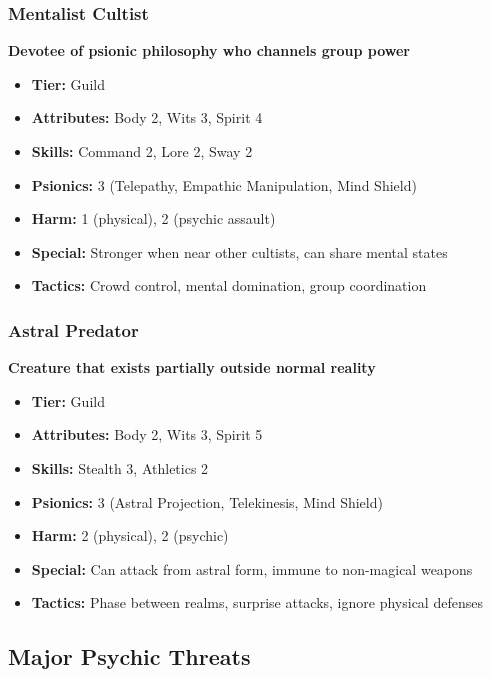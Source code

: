 \documentclass[11pt,twoside]{article}
\begin{document}
\subsubsection{Mentalist Cultist}
\textbf{Devotee of psionic philosophy who channels group power}
\begin{itemize}[leftmargin=*]
    \item \textbf{Tier:} Guild
    \item \textbf{Attributes:} Body 2, Wits 3, Spirit 4
    \item \textbf{Skills:} Command 2, Lore 2, Sway 2
    \item \textbf{Psionics:} 3 (Telepathy, Empathic Manipulation, Mind Shield)
    \item \textbf{Harm:} 1 (physical), 2 (psychic assault)
    \item \textbf{Special:} Stronger when near other cultists, can share mental states
    \item \textbf{Tactics:} Crowd control, mental domination, group coordination
\end{itemize}

\subsubsection{Astral Predator}
\textbf{Creature that exists partially outside normal reality}
\begin{itemize}[leftmargin=*]
    \item \textbf{Tier:} Guild
    \item \textbf{Attributes:} Body 2, Wits 3, Spirit 5
    \item \textbf{Skills:} Stealth 3, Athletics 2
    \item \textbf{Psionics:} 3 (Astral Projection, Telekinesis, Mind Shield)
    \item \textbf{Harm:} 2 (physical), 2 (psychic)
    \item \textbf{Special:} Can attack from astral form, immune to non-magical weapons
    \item \textbf{Tactics:} Phase between realms, surprise attacks, ignore physical defenses
\end{itemize}

\subsection{Major Psychic Threats}
\end{document}
